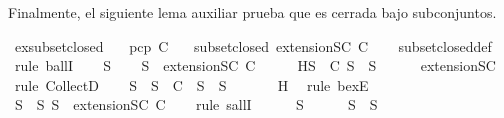 \begin{isabellebody}
\isamarkupfalse%
%
\endisatagproof
{\isafoldproof}%
%
\isadelimproof
%
\endisadelimproof
%
\begin{isamarkuptext}%
Finalmente, el siguiente lema auxiliar prueba que  es cerrada bajo subconjuntos.%
\end{isamarkuptext}\isamarkuptrue%
\isamarkupfalse%
\ ex{}{\isacharunderscore}subset{\isacharunderscore}closed{\isacharcolon}\isanewline
\ \ \ {\isachardoublequoteopen}pcp\ C{\isachardoublequoteclose}\isanewline
\ \ \ {\isachardoublequoteopen}subset{\isacharunderscore}closed\ {\isacharparenleft}extensionSC\ C{\isacharparenright}{\isachardoublequoteclose}\isanewline
%
\isadelimproof
\ \ %
\endisadelimproof
%
\isatagproof
{}\isamarkupfalse%
\ subset{\isacharunderscore}closed{\isacharunderscore}def\isanewline
{}\isamarkupfalse%
\ {\isacharparenleft}rule\ ballI{\isacharparenright}\isanewline
\ \ \isamarkupfalse%
\ S{\isacharprime}\isanewline
\ \ \isamarkupfalse%
\ {\isachardoublequoteopen}S{\isacharprime}\ {\isasymin}\ {\isacharparenleft}extensionSC\ C{\isacharparenright}{\isachardoublequoteclose}\isanewline
\ \ \isamarkupfalse%
\ \isamarkupfalse%
\ H{\isacharcolon}{\isachardoublequoteopen}{\isasymexists}S\ {\isasymin}\ C{\isachardot}\ S{\isacharprime}\ {\isasymsubseteq}\ S{\isachardoublequoteclose}\isanewline
\ \ \ \ \isamarkupfalse%
\ extensionSC\ \isamarkupfalse%
\ {\isacharparenleft}rule\ CollectD{\isacharparenright}\isanewline
\ \ \isamarkupfalse%
\ S\ \ {\isacartoucheopen}S\ {\isasymin}\ C{\isacartoucheclose}\ \ {\isacartoucheopen}S{\isacharprime}\ {\isasymsubseteq}\ S{\isacartoucheclose}\ \isanewline
\ \ \ \ \isamarkupfalse%
\ H\ \isamarkupfalse%
\ {\isacharparenleft}rule\ bexE{\isacharparenright}\ \isanewline
\ \ \isamarkupfalse%
\ {\isachardoublequoteopen}{\isasymforall}S{\isacharprime}{\isacharprime}\ {\isasymsubseteq}\ S{\isacharprime}{\isachardot}\ S{\isacharprime}{\isacharprime}\ {\isasymin}\ {\isacharparenleft}extensionSC\ C{\isacharparenright}{\isachardoublequoteclose}\isanewline
\ \ \isamarkupfalse%
\ {\isacharparenleft}rule\ sallI{\isacharparenright}\isanewline
\ \ \ \ \isamarkupfalse%
\ S{\isacharprime}{\isacharprime}\isanewline
\ \ \ \ \isamarkupfalse%
\ {\isachardoublequoteopen}S{\isacharprime}{\isacharprime}\ {\isasymsubseteq}\ S{\isacharprime}{\isachardoublequoteclose}\ \isanewline

\end{isabellebody}
